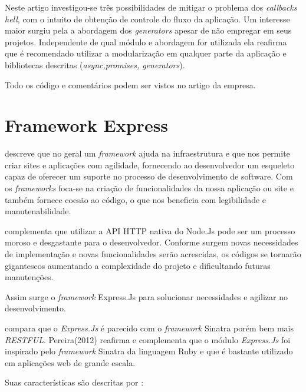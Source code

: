  Neste artigo \cite{Strongloop:2013} investigou-se três possibilidades de mitigar o problema dos \textit{callbacks hell}, com o 
  intuito de obtenção de controle do fluxo da aplicação. Um interesse maior surgiu pela a abordagem dos \textit{generators}
  apesar de não empregar em seus projetos. Independente de qual módulo e abordagem for utilizada ela reafirma que é recomendado
  utilizar a modularização em qualquer parte da aplicação e bibliotecas descritas (\textit{async,promises, generators}).
  
  Todo os código e comentários podem ser vistos no artigo da empresa. \cite{Strongloop:2013}
  

\section{Framework Express}
\label{framework-express}

  \cite{Powers:2012} descreve que no geral um \textit{framework} ajuda na infraestrutura e que nos permite criar sites e aplicações
  com agilidade, fornecendo ao desenvolvedor um esqueleto capaz de oferecer um suporte no processo de desenvolvimento de
  software. Com os \textit{frameworks} foca-se na criação de funcionalidades da nossa aplicação ou site e 
  também fornece coesão ao código, o que nos beneficia com legibilidade e manutenabilidade.

  \cite{Pereira:2013} complementa que utilizar a API HTTP nativa do Node.Js pode ser um processo moroso e desgastante
  para o desenvolvedor. 
  Conforme surgem novas necessidades de implementação e novas funcionalidades serão acrescidas,
  os códigos se tornarão gigantescos aumentando a complexidade do projeto e dificultando futuras manutenções.
  
  Assim surge o \textit{framework} Express.Js para solucionar necessidades e agilizar no desenvolvimento.
  
   compara que o \textit{Express.Js} é parecido com o \textit{framework} Sinatra porém bem mais \textit{RESTFUL}. 
  Pereira(2012) reafirma e complementa que o módulo \textit{Express.Js} foi inspirado pelo \textit{framework} Sinatra da 
  linguagem Ruby e que é bastante utilizado em aplicações web de grande escala.
  
  Suas características são descritas por :
  

